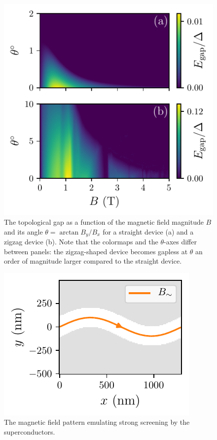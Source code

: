 \documentclass[english, twocolumn, 10pt, aps, superscriptaddress, floatfix, prb, citeautoscript]{revtex4-1}
\begin{document}
\begin{figure}[!htb]
\centering
\includegraphics[width=0.9\columnwidth]{figures/tilted_angle_phase_diagram.pdf}
\caption{The topological gap as a function of the magnetic field magnitude $B$ and its angle $\theta=\arctan{B_y/B_x}$ for a straight device (a) and a zigzag device (b).
Note that the colormaps and the $\theta$-axes differ between panels: the zigzag-shaped device becomes gapless at $\theta$ an order of magnitude larger compared to the straight device.
\label{fig:tilted_angle_phase_diagram}}
\end{figure}

\begin{figure}[!htb]
\centering
\includegraphics{figures/syst_snaking_magnetic_field.pdf}
\caption{
The magnetic field pattern emulating strong screening by the superconductors.
\label{fig:syst_snaking_magnetic_field}}
\end{figure}
\end{document}
